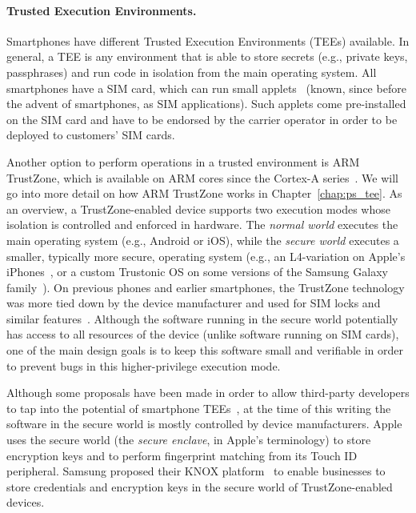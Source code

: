 \paragraph{Trusted Execution Environments.} Smartphones have different Trusted Execution Environments (TEEs) available. In general, a TEE is any environment that is able to store secrets (e.g., private keys, passphrases) and run code in isolation from the main operating system. All smartphones have a SIM card, which can run small applets~\cite{global} (known, since before the advent of smartphones, as SIM applications). Such applets come pre-installed on the SIM card and have to be endorsed by the carrier operator in order to be deployed to customers' SIM cards. 

Another option to perform operations in a trusted environment is ARM TrustZone, which is available on ARM cores since the Cortex-A series~\cite{ARMTrustZone,armTZslides}. We will go into more detail on how ARM TrustZone works in Chapter~\ref{chap:ps_tee}. As an overview, a TrustZone-enabled device supports two execution modes whose isolation is controlled and enforced in hardware. The \emph{normal world} executes the main operating system (e.g., Android or iOS), while the \emph{secure world} executes a smaller, typically more secure, operating system (e.g., an L4-variation on Apple's iPhones~\cite{applesecurity}, or a custom Trustonic OS on some versions of the Samsung Galaxy family~\cite{trustonicknox}). On previous phones and earlier smartphones, the TrustZone technology was more tied down by the device manufacturer and used for SIM locks and similar features~\cite{kostiainen2011codaspy}. Although the software running in the secure world potentially has access to all resources of the device (unlike software running on SIM cards), one of the main design goals is to keep this software small and verifiable in order to prevent bugs in this higher-privilege execution mode.

Although some proposals have been made in order to allow third-party developers to tap into the potential of smartphone TEEs~\cite{kostiainen09asiaccs,kostiainen2011acns,kari11stc}, at the time of this writing the software in the secure world is mostly controlled by device manufacturers. Apple uses the secure world (the \emph{secure enclave}, in Apple's terminology) to store encryption keys and to perform fingerprint matching from its Touch ID peripheral. Samsung proposed their KNOX platform~\cite{trustonicknox} to enable businesses to store credentials and encryption keys in the secure world of TrustZone-enabled devices.

